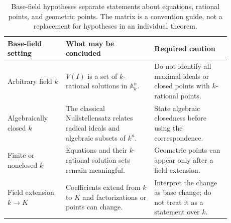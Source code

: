 \begin{table}[htbp]
\centering\small
\begin{tabular}{p{0.23\linewidth}p{0.35\linewidth}p{0.30\linewidth}}
\toprule
Base-field setting & What may be concluded & Required caution\\
\midrule
Arbitrary field $k$ & $V(I)$ is a set of $k$-rational solutions in $\mathbb A_k^n$. & Do not identify all maximal ideals or closed points with $k$-rational points.\\
Algebraically closed $k$ & The classical Nullstellensatz relates radical ideals and algebraic subsets of $k^n$. & State algebraic closedness before using the correspondence.\\
Finite or nonclosed $k$ & Equations and their $k$-rational solution sets remain meaningful. & Geometric points can appear only after a field extension.\\
Field extension $k\to K$ & Coefficients extend from $k$ to $K$ and factorizations or points can change. & Interpret the change as base change; do not treat it as a statement over $k$.\\
\bottomrule
\end{tabular}
\caption{Base-field hypotheses separate statements about equations, rational points, and geometric points. The matrix is a convention guide, not a replacement for hypotheses in an individual theorem.}
\label{tab:vi01-base-field-hypotheses}
\end{table}
